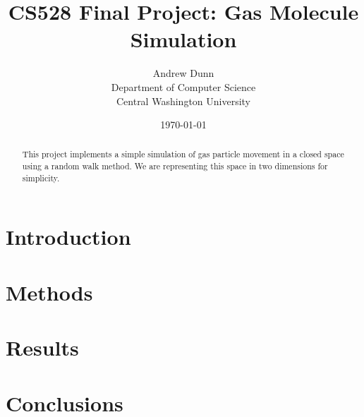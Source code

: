 \documentclass[12pt,a4paper]{article}
\title{\huge{\textbf{CS528 Final Project: Gas Molecule Simulation}}}
\author{
	Andrew Dunn\\
	Department of Computer Science\\
	Central Washington University}
\date{\today}
\begin{document}
	
	\maketitle
	\thispagestyle{empty}
	
	\clearpage %
	
	\begin{abstract}
		This project implements a simple simulation of gas particle movement in a closed space using a random walk method. We are representing this space in two dimensions for simplicity.
	\end{abstract}
	\thispagestyle{empty}
	
	\clearpage %
	
	\section{Introduction} %

	
	
	\section{Methods}\label{methods}


	
	\section{Results}\label{results}
	
	
	
	\section{Conclusions}\label{conclusions}



	
	
	
\end{document}
